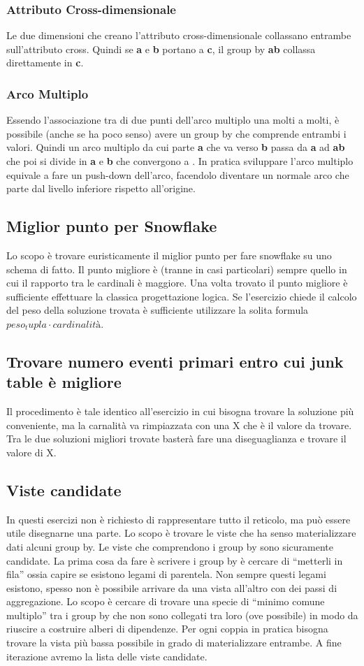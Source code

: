 \subsubsection{Attributo Cross-dimensionale}
Le due dimensioni che creano l'attributo cross-dimensionale collassano entrambe sull'attributo cross. Quindi  se \textbf{a} e \textbf{b} portano a  \textbf{c}, il group by {\textbf{ab}} collassa direttamente in {\textbf{c}}.
\subsubsection{Arco Multiplo}
Essendo l'associazione tra di due punti dell'arco multiplo una molti a molti, è possibile (anche se ha poco senso) avere un group by che comprende entrambi i valori. Quindi un arco multiplo da cui parte \textbf{a} che va verso \textbf{b} passa da \textbf{a} ad \textbf{ab}  che poi si divide in \textbf{a} e \textbf{b} che convergono a {}. In pratica sviluppare l'arco multiplo equivale a fare un push-down dell'arco, facendolo diventare un normale arco che parte dal livello inferiore rispetto all'origine.
\subsection{Miglior punto per Snowflake}
Lo scopo è trovare euristicamente il miglior punto per fare snowflake su uno schema di fatto. Il punto migliore è (tranne in casi particolari) sempre quello in cui il rapporto tra le cardinali è maggiore. Una volta trovato il punto migliore è sufficiente effettuare la classica progettazione logica. Se l’esercizio chiede il calcolo del peso della soluzione trovata è sufficiente utilizzare la solita formula $peso_tupla \cdot cardinalità$.
\subsection{Trovare numero eventi primari entro cui junk table è migliore}
Il procedimento è tale identico all’esercizio in cui bisogna trovare la soluzione più conveniente, ma la carnalità va rimpiazzata con una X che è il valore da trovare. Tra le due soluzioni migliori trovate basterà fare una diseguaglianza e trovare il valore di X.
\subsection{Viste candidate}
In questi esercizi non è richiesto di rappresentare tutto il reticolo, ma può essere utile disegnarne una parte.  Lo scopo è trovare le viste che ha senso materializzare dati alcuni group by. Le viste che comprendono i group by sono sicuramente candidate. La prima cosa da fare è scrivere i group by è cercare di “metterli in fila” ossia capire se esistono legami di parentela. Non sempre questi legami esistono, spesso non è possibile arrivare da una vista all’altro con dei passi di aggregazione. Lo scopo è cercare di trovare una specie di “minimo comune multiplo” tra i group by che non sono collegati tra loro (ove possibile) in modo da riuscire a costruire alberi di dipendenze. Per ogni coppia in pratica bisogna trovare la vista più bassa possibile in grado di materializzare entrambe. A fine iterazione avremo la lista delle viste candidate.
